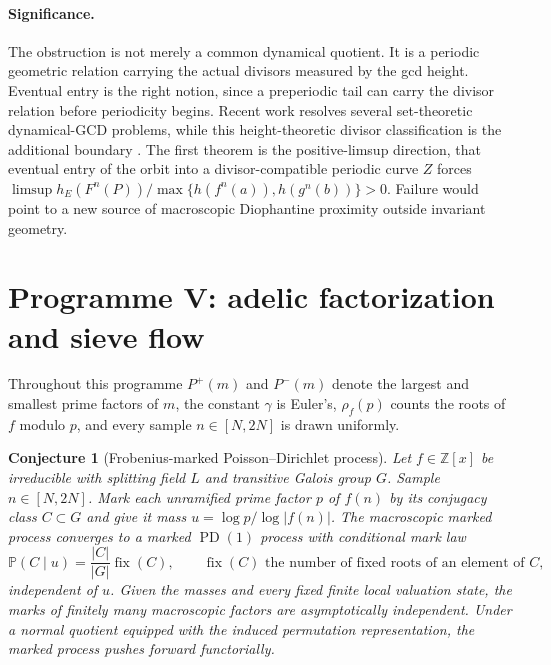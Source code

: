 \documentclass[11pt]{article}
\newtheorem{conjecture}{Conjecture}
\theoremstyle{definition}
\newcommand{\PD}{\operatorname{PD}}
\newcommand{\Pp}{\mathbb P}
\newcommand{\Z}{\mathbb Z}
\providecommand{\Z}{\mathbb Z}
\providecommand{\Pp}{\mathbb P}
\begin{document}
\paragraph{Significance.}
The obstruction is not merely a common dynamical quotient.  It is a periodic geometric
relation carrying the actual divisors measured by the gcd height.  Eventual entry is the right
notion, since a preperiodic tail can carry the divisor relation before periodicity
begins.  Recent work resolves several set-theoretic
dynamical-GCD problems, while this height-theoretic divisor classification is the additional boundary \cite{YangZhong}. The first theorem is the positive-limsup direction, that eventual entry of the orbit into a divisor-compatible periodic curve $Z$ forces $\limsup h_E(F^n(P))/\max\{h(f^n(a)),h(g^n(b))\}>0$.  Failure would point to a new source of
macroscopic Diophantine proximity outside invariant geometry.

\section{Programme V: adelic factorization and sieve flow}

Throughout this programme $P^+(m)$ and $P^-(m)$ denote the largest and smallest prime
factors of $m$, the constant $\gamma$ is Euler's, $\rho_f(p)$ counts the roots
of $f$ modulo $p$, and every sample $n\in[N,2N]$ is drawn uniformly.

\begin{conjecture}[Frobenius-marked Poisson--Dirichlet process]\label{s21}
Let $f\in\Z[x]$ be irreducible with splitting field $L$ and transitive Galois group
$G$.  Sample $n\in[N,2N]$.  Mark each unramified prime factor $p$ of $f(n)$ by its
conjugacy class $C\subset G$ and give it mass $u=\log p/\log|f(n)|$.  The macroscopic
marked process converges to a marked $\PD(1)$ process with conditional mark law
\[
 \Pp(C\mid u)=\frac{|C|}{|G|}\operatorname{fix}(C),\qquad\text{$\operatorname{fix}(C)$ the number of fixed roots of an element of $C$,}
\]
independent of $u$.  Given the masses and every fixed finite local valuation state, the
marks of finitely many macroscopic factors are asymptotically independent.  Under a
normal quotient equipped with the induced permutation representation, the marked
process pushes forward functorially.
\end{conjecture}
\end{document}

